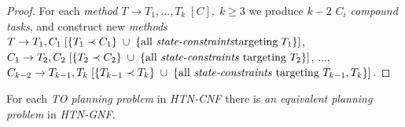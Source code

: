 \begin{proof}
    For each \emph{method} $T \rightarrow T_1, \dots, T_k \; [C], \; k \geq 3$ we produce $k - 2$ $C_i$ \emph{compound tasks}, and construct new \emph{methods} $T \rightarrow T_1, C_1 \; [\{T_1 \prec C_1\} \; \cup \; \{\text{all \emph{state-constraints}} \\ \text{targeting} \; T_1\}]$, $C_1 \rightarrow T_2, C_2 \; [\{T_2 \prec C_2\} \; \cup \; \{\text{all \emph{state-constraints} targeting $T_2$}\}]$, $\dots$, $C_{k-2} \rightarrow T_{k-1}, T_k \; [\{T_{k-1} \prec T_k\} \; \cup \; \{\text{all \emph{state-constraints} targeting $T_{k-1}, T_k$}\}]$.
\end{proof}

\begin{thm}\label{thm04:13}
    For each \emph{TO planning problem} in \emph{HTN-CNF} there is \emph{an equivalent planning problem} in \emph{HTN-GNF}.
\end{thm}
